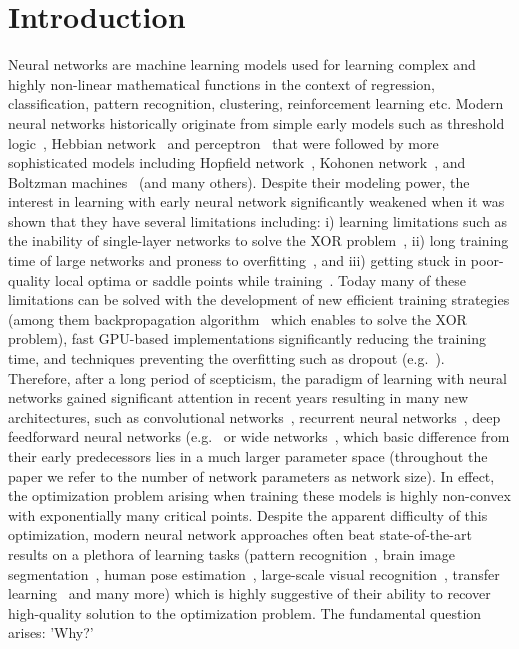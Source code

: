 \documentclass[twoside]{article}
\begin{document}
\section{Introduction}

Neural networks are machine learning models used for learning complex and highly non-linear mathematical functions in the context of regression, classification, pattern recognition, clustering, reinforcement learning etc. Modern neural networks historically originate from simple early models such as threshold logic~\cite{mcculloch43a}, Hebbian network~\cite{Hebb:1949} and perceptron~\cite{rosenblatt58a} that were followed by more sophisticated models including Hopfield network~\cite{Hopfield:1988:NNP:65669.104422}, Kohonen network~\cite{Kohonen1982}, and Boltzman machines~\cite{Hinton:1986:LRB:104279.104291} (and many others). Despite their modeling power, the interest in learning with early neural network significantly weakened when it was shown that they have several limitations including: i) learning limitations such as the inability of single-layer networks to solve the XOR problem~\cite{minsky69perceptrons}, ii) long training time of large networks and proness to overfitting~\cite{JMLR:v15:srivastava14a}, and iii) getting stuck in poor-quality local optima or saddle points while training~\cite{Larochelle:2009:EST:1577069.1577070}. Today many of these limitations can be solved with the development of new efficient training strategies (among them backpropagation algorithm~\cite{Werbos:74} which enables to solve the XOR problem), fast GPU-based implementations significantly reducing the training time, and techniques preventing the overfitting such as dropout (e.g.~\cite{JMLR:v15:srivastava14a}). Therefore, after a long period of scepticism, the paradigm of learning with neural networks gained significant attention in recent years resulting in many new architectures, such as convolutional networks~\cite{lecun-gradientbased-learning-applied-1998}, recurrent neural networks~\cite{Graves:2009:NCS:1525650.1525782}, deep feedforward neural networks (e.g.~\cite{DBLP:journals/corr/Schmidhuber14} or wide networks~\cite{Huang14}, which basic difference from their early predecessors lies in a much larger parameter space (throughout the paper we refer to the number of network parameters as network size). In effect, the optimization problem arising when training these models is highly non-convex with exponentially many critical points. Despite the apparent difficulty of this optimization, modern neural network approaches often beat state-of-the-art results on a plethora of learning tasks (pattern recognition~\cite{journals/nn/CiresanMMS12}, brain image segmentation~\cite{NIPS2012_4741}, human pose estimation~\cite{DBLP:journals/corr/TompsonJLB14}, large-scale visual recognition~\cite{sermanet-iclr-14}, transfer learning~\cite{conf/icml/GoodfellowCB12} and many more) which is highly suggestive of their ability to recover high-quality solution to the optimization problem. The fundamental question arises: 'Why?' 
\end{document}
